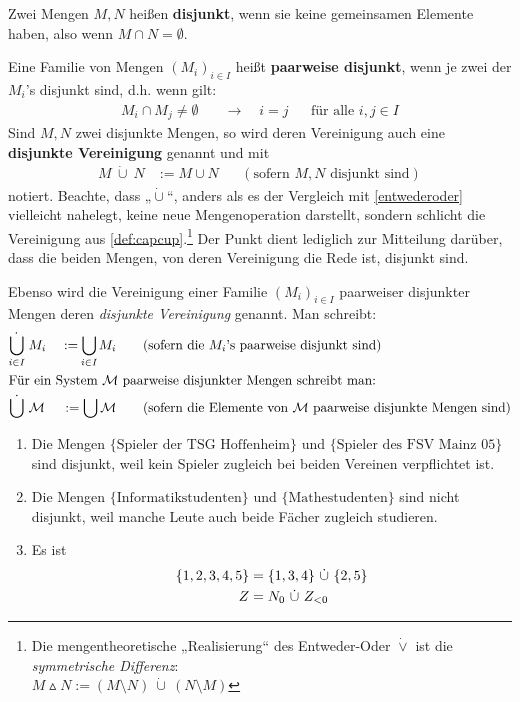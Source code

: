 \begin{defin}[Disjunktheit] \label{def:disjunkt} 
    Zwei Mengen $M,N$ heißen \textbf{disjunkt}, wenn sie keine gemeinsamen Elemente haben, also wenn $M\cap N=\emptyset$.

    Eine Familie von Mengen $(M_i)_{i\in I}$ heißt \textbf{paarweise disjunkt}, wenn je zwei der $M_i$'s disjunkt sind, d.h. wenn gilt:
    \begin{align*}
        M_i\cap M_j \neq  \emptyset \quad& \to\quad i=j &&\text{für alle $i,j\in I$}
    \end{align*}
    Sind $M,N$ zwei disjunkte Mengen, so wird deren Vereinigung auch eine \textbf{disjunkte Vereinigung} genannt und mit
    \begin{align*}
        M\ \dot\cup\ N & := M\cup N && (\text{sofern $M,N$ disjunkt sind})
    \end{align*}
    notiert. Beachte, dass „$\dot\cup$“, anders als es der Vergleich mit \cref{entwederoder} vielleicht nahelegt, keine neue Mengenoperation darstellt, sondern schlicht die Vereinigung aus \cref{def:capcup}.\footnote{Die mengentheoretische „Realisierung“ des Entweder-Oder $\dot\lor$ ist die \emph{symmetrische Differenz}: \\
    $M\vartriangle N:= (M\setminus N)\ \dot\cup\ (N\setminus M)$} Der Punkt dient lediglich zur Mitteilung darüber, dass die beiden Mengen, von deren Vereinigung die Rede ist, disjunkt sind.

    Ebenso wird die Vereinigung einer Familie $(M_i)_{i\in I}$ paarweiser disjunkter Mengen deren \emph{disjunkte Vereinigung} genannt. Man schreibt:
    \begin{alignat*}{2}
        \dot{\smashoperator[r]{\bigcup_{i\in I}}}\ & M_i\ & := \smashoperator{\bigcup_{i\in I}} M_i \qquad &(\text{sofern die $M_i$'s paarweise disjunkt sind}) \\
        \intertext{Für ein System $\calM$ paarweise disjunkter Mengen schreibt man:}
        \dot{\bigcup}\ & \calM & := \bigcup \calM \qquad &(\text{sofern die Elemente von $\calM$ paarweise disjunkte Mengen sind})
    \end{alignat*}
\end{defin}


\begin{bsp} \label{bsp:disjunkt} \quad
    \begin{enumerate}
        \item Die Mengen $\{\text{Spieler der TSG Hoffenheim}\}$ und $\{\text{Spieler des FSV Mainz 05}\}$ sind disjunkt, weil kein Spieler zugleich bei beiden Vereinen verpflichtet ist.
        \item Die Mengen $\{\text{Informatikstudenten}\}$ und $\{\text{Mathestudenten}\}$ sind nicht disjunkt, weil manche Leute auch beide Fächer zugleich studieren.
        \item Es ist
        \begin{align*}
        \{1,2,3,4,5\} & = \{1,3,4\}\ \dot\cup\ \{2,5\} \\
        \relax Z & = \relax N_0\ \dot\cup\ \relax Z_{<0}
        \end{align*}
    \end{enumerate}
\end{bsp}


